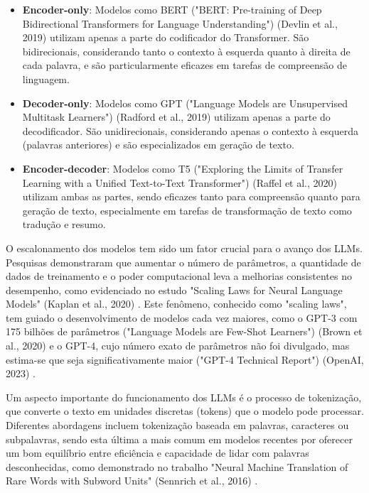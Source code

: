 \documentclass[tcc,capa]{texufpel}
\begin{document}
\begin{itemize}
    \item \textbf{Encoder-only}: Modelos como BERT ("BERT: Pre-training of Deep Bidirectional Transformers for Language Understanding") (Devlin et al., 2019) \cite{devlin2019bert} utilizam apenas a parte do codificador do Transformer. São bidirecionais, considerando tanto o contexto à esquerda quanto à direita de cada palavra, e são particularmente eficazes em tarefas de compreensão de linguagem.
    
    \item \textbf{Decoder-only}: Modelos como GPT ("Language Models are Unsupervised Multitask Learners") (Radford et al., 2019) \cite{radford2019language} utilizam apenas a parte do decodificador. São unidirecionais, considerando apenas o contexto à esquerda (palavras anteriores) e são especializados em geração de texto.
    
    \item \textbf{Encoder-decoder}: Modelos como T5 ("Exploring the Limits of Transfer Learning with a Unified Text-to-Text Transformer") (Raffel et al., 2020) \cite{raffel2020exploring} utilizam ambas as partes, sendo eficazes tanto para compreensão quanto para geração de texto, especialmente em tarefas de transformação de texto como tradução e resumo.
\end{itemize}

O escalonamento dos modelos tem sido um fator crucial para o avanço dos LLMs. Pesquisas demonstraram que aumentar o número de parâmetros, a quantidade de dados de treinamento e o poder computacional leva a melhorias consistentes no desempenho, como evidenciado no estudo "Scaling Laws for Neural Language Models" (Kaplan et al., 2020) \cite{kaplan2020scaling}. Este fenômeno, conhecido como "scaling laws", tem guiado o desenvolvimento de modelos cada vez maiores, como o GPT-3 com 175 bilhões de parâmetros ("Language Models are Few-Shot Learners") (Brown et al., 2020) \cite{brown2020language} e o GPT-4, cujo número exato de parâmetros não foi divulgado, mas estima-se que seja significativamente maior ("GPT-4 Technical Report") (OpenAI, 2023) \cite{openai2023gpt4}.

Um aspecto importante do funcionamento dos LLMs é o processo de tokenização, que converte o texto em unidades discretas (tokens) que o modelo pode processar. Diferentes abordagens incluem tokenização baseada em palavras, caracteres ou subpalavras, sendo esta última a mais comum em modelos recentes por oferecer um bom equilíbrio entre eficiência e capacidade de lidar com palavras desconhecidas, como demonstrado no trabalho "Neural Machine Translation of Rare Words with Subword Units" (Sennrich et al., 2016) \cite{sennrich2016neural}.
\end{document}
